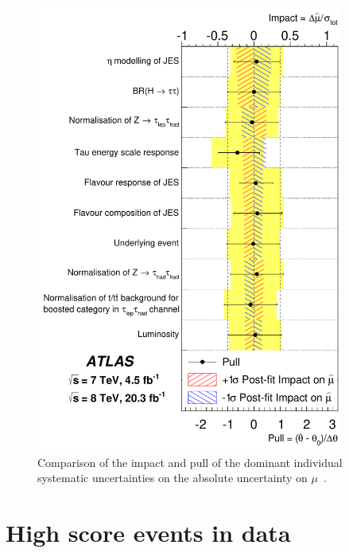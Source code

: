 \begin{figure}[tp]
  \centering
  \includegraphics[width=0.90\textwidth]{figures/HIGG-2013-32/fig_07}
  \caption{Comparison of the impact and pull of the dominant individual systematic uncertainties on the absolute uncertainty on $\mu$~\cite{HIGG-2013-32}.}
  \label{fig:results-uncertainties-2}
\end{figure}

\section{High score events in data}

